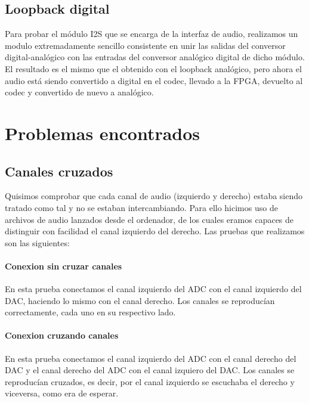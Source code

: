 	\subsection{Loopback digital}
		
		Para probar el módulo I2S que se encarga de la interfaz de audio, realizamos un modulo extremadamente sencillo consistente en unir las salidas del conversor digital-analógico con las entradas del conversor analógico digital de dicho módulo. El resultado es el mismo que el obtenido con el loopback analógico, pero ahora el audio está siendo convertido a digital en el codec, llevado a la FPGA, devuelto al codec y convertido de nuevo a analógico.

		

	
\section{Problemas encontrados}

	

	\subsection{Canales cruzados}

		Quisimos comprobar que cada canal de audio (izquierdo y derecho) estaba siendo tratado como tal y no se estaban intercambiando. Para ello hicimos uso de archivos de audio lanzados desde el ordenador, de los cuales eramos capaces de distinguir con facilidad el canal izquierdo del derecho. Las pruebas que realizamos son las siguientes:

		\paragraph{Conexion sin cruzar canales}
			En esta prueba conectamos el canal izquierdo del ADC con el canal izquierdo del DAC, haciendo lo mismo con el canal derecho. Los canales se reproducían correctamente, cada uno en su respectivo lado.


		\paragraph{Conexion cruzando canales}
			En esta prueba conectamos el canal izquierdo del ADC con el canal derecho del DAC y el canal derecho del ADC con el canal izquiero del DAC. Los canales se reproducían cruzados, es decir, por el canal izquierdo se escuchaba el derecho y viceversa, como era de esperar.\\

